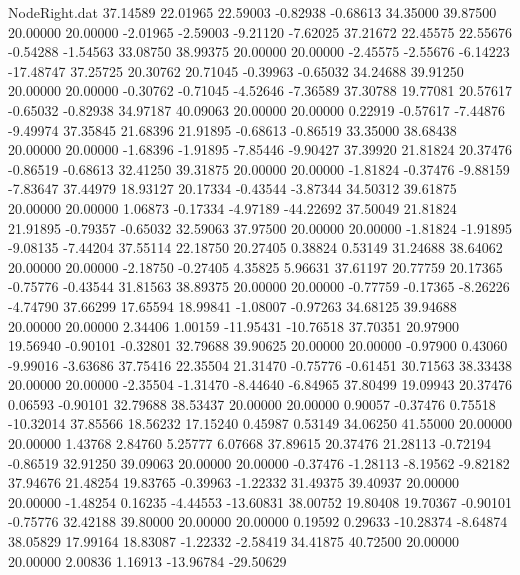 \begin{filecontents}{NodeRight.dat}
  37.14589   22.01965   22.59003    -0.82938   -0.68613   34.35000   39.87500   20.00000   20.00000   -2.01965   -2.59003   -9.21120   -7.62025
  37.21672   22.45575   22.55676    -0.54288   -1.54563   33.08750   38.99375   20.00000   20.00000   -2.45575   -2.55676   -6.14223  -17.48747
  37.25725   20.30762   20.71045    -0.39963   -0.65032   34.24688   39.91250   20.00000   20.00000   -0.30762   -0.71045   -4.52646   -7.36589
  37.30788   19.77081   20.57617    -0.65032   -0.82938   34.97187   40.09063   20.00000   20.00000    0.22919   -0.57617   -7.44876   -9.49974
  37.35845   21.68396   21.91895    -0.68613   -0.86519   33.35000   38.68438   20.00000   20.00000   -1.68396   -1.91895   -7.85446   -9.90427
  37.39920   21.81824   20.37476    -0.86519   -0.68613   32.41250   39.31875   20.00000   20.00000   -1.81824   -0.37476   -9.88159   -7.83647
  37.44979   18.93127   20.17334    -0.43544   -3.87344   34.50312   39.61875   20.00000   20.00000    1.06873   -0.17334   -4.97189  -44.22692
  37.50049   21.81824   21.91895    -0.79357   -0.65032   32.59063   37.97500   20.00000   20.00000   -1.81824   -1.91895   -9.08135   -7.44204
  37.55114   22.18750   20.27405     0.38824    0.53149   31.24688   38.64062   20.00000   20.00000   -2.18750   -0.27405    4.35825    5.96631
  37.61197   20.77759   20.17365    -0.75776   -0.43544   31.81563   38.89375   20.00000   20.00000   -0.77759   -0.17365   -8.26226   -4.74790
  37.66299   17.65594   18.99841    -1.08007   -0.97263   34.68125   39.94688   20.00000   20.00000    2.34406    1.00159  -11.95431  -10.76518
  37.70351   20.97900   19.56940    -0.90101   -0.32801   32.79688   39.90625   20.00000   20.00000   -0.97900    0.43060   -9.99016   -3.63686
  37.75416   22.35504   21.31470    -0.75776   -0.61451   30.71563   38.33438   20.00000   20.00000   -2.35504   -1.31470   -8.44640   -6.84965
  37.80499   19.09943   20.37476     0.06593   -0.90101   32.79688   38.53437   20.00000   20.00000    0.90057   -0.37476    0.75518  -10.32014
  37.85566   18.56232   17.15240     0.45987    0.53149   34.06250   41.55000   20.00000   20.00000    1.43768    2.84760    5.25777    6.07668
  37.89615   20.37476   21.28113    -0.72194   -0.86519   32.91250   39.09063   20.00000   20.00000   -0.37476   -1.28113   -8.19562   -9.82182
  37.94676   21.48254   19.83765    -0.39963   -1.22332   31.49375   39.40937   20.00000   20.00000   -1.48254    0.16235   -4.44553  -13.60831
  38.00752   19.80408   19.70367    -0.90101   -0.75776   32.42188   39.80000   20.00000   20.00000    0.19592    0.29633  -10.28374   -8.64874
  38.05829   17.99164   18.83087    -1.22332   -2.58419   34.41875   40.72500   20.00000   20.00000    2.00836    1.16913  -13.96784  -29.50629

\end{filecontents}
